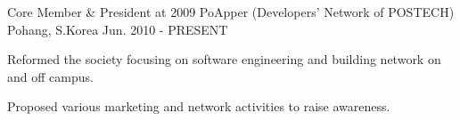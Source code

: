 

\begin{cventries}

  \cventry
    {Core Member \& President at 2009} %
    {PoApper (Developers' Network of POSTECH)} %
    {Pohang, S.Korea} %
    {Jun. 2010 - PRESENT} %
    {
      \begin{cvitems} %
        \item {Reformed the society focusing on software engineering and building network on and off campus.}
        \item {Proposed various marketing and network activities to raise awareness.}
      \end{cvitems}
    }


\end{cventries}
